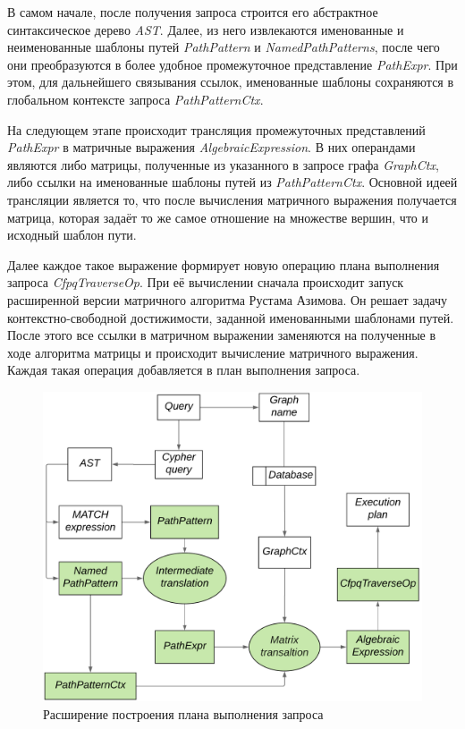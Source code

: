 В самом начале, после получения запроса строится его абстрактное синтаксическое дерево \textit{AST}. Далее, из него извлекаются именованные и неименованные шаблоны путей \textit{PathPattern} и \textit{NamedPathPatterns}, после чего они преобразуются в более удобное промежуточное представление \textit{PathExpr}. При этом, для дальнейшего связывания ссылок, именованные шаблоны сохраняются в глобальном контексте запроса \textit{PathPatternCtx}.

На следующем этапе происходит трансляция промежуточных представлений \textit{PathExpr} в матричные выражения \textit{AlgebraicExpression}. В них операндами являются либо матрицы, полученные из указанного в запросе графа \textit{GraphCtx}, либо ссылки на именованные шаблоны путей из \textit{PathPatternCtx}. Основной идеей трансляции является то, что после вычисления матричного выражения получается матрица, которая задаёт то же самое отношение на множестве вершин, что и исходный шаблон пути.

Далее каждое такое выражение формирует новую операцию плана выполнения запроса \textit{CfpqTraverseOp}. При её вычислении сначала происходит запуск расширенной версии матричного алгоритма Рустама Азимова. Он решает задачу контекстно-свободной достижимости, заданной именованными шаблонами путей. После этого все ссылки в матричном выражении заменяются на полученные в ходе алгоритма матрицы и происходит вычисление матричного выражения. Каждая такая операция добавляется в план выполнения запроса.


\begin{figure}[H]
\centering
    \includegraphics[width=1.0\linewidth]{Terekhov/pictures/execution_plan_3.png}
    \caption{Расширение построения плана выполнения запроса}
    \label{fig:execution_plan}
\end{figure}

